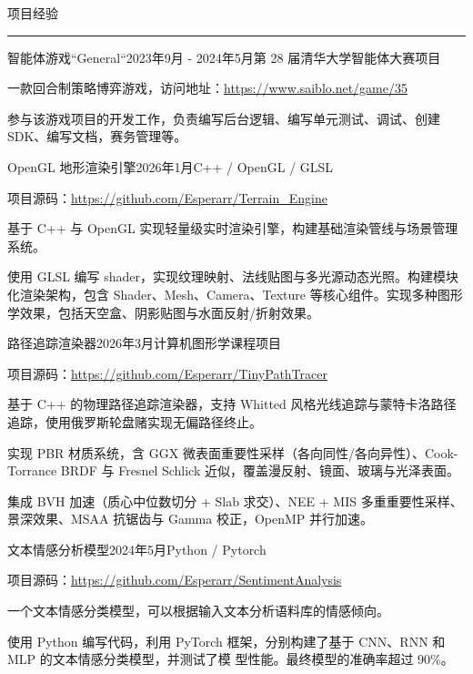 \documentclass{resume} %
\renewenvironment{rSection}[1]{
\sectionskip
\textcolor{TsinghuaPurple}{\MakeUppercase{#1}}
\sectionlineskip
\hrule
\begin{list}{}{
\setlength{\leftmargin}{0em}
}
\item[]
}{
\end{list}
}
\begin{document}
\begin{rSection}{项目经验}

\begin{rSubsection}{智能体游戏``General``}{2023年9月 - 2024年5月}{第 28 届清华大学智能体大赛项目}{}
\item 一款回合制策略博弈游戏，访问地址：\url{https://www.saiblo.net/game/35}
\item 参与该游戏项目的开发工作，负责编写后台逻辑、编写单元测试、调试、创建 SDK、编写文档，赛务管理等。
\end{rSubsection}  

\begin{rSubsection}{OpenGL 地形渲染引擎}{2026年1月}{C++ / OpenGL / GLSL}{}
\item 项目源码：\url{https://github.com/Esperarr/Terrain_Engine}
\item 基于 C++ 与 OpenGL 实现轻量级实时渲染引擎，构建基础渲染管线与场景管理系统。
\item 使用 GLSL 编写 shader，实现纹理映射、法线贴图与多光源动态光照。构建模块化渲染架构，包含 Shader、Mesh、Camera、Texture 等核心组件。实现多种图形学效果，包括天空盒、阴影贴图与水面反射/折射效果。
\end{rSubsection}

\begin{rSubsection}{路径追踪渲染器}{2026年3月}{计算机图形学课程项目}{}
\item 项目源码：\url{https://github.com/Esperarr/TinyPathTracer}
\item 基于 C++ 的物理路径追踪渲染器，支持 Whitted 风格光线追踪与蒙特卡洛路径追踪，使用俄罗斯轮盘赌实现无偏路径终止。
\item 实现 PBR 材质系统，含 GGX 微表面重要性采样（各向同性/各向异性）、Cook-Torrance BRDF 与 Fresnel Schlick 近似，覆盖漫反射、镜面、玻璃与光泽表面。
\item 集成 BVH 加速（质心中位数切分 + Slab 求交）、NEE + MIS 多重重要性采样、景深效果、MSAA 抗锯齿与 Gamma 校正，OpenMP 并行加速。
\end{rSubsection}

\begin{rSubsection}{文本情感分析模型}{2024年5月}{Python / Pytorch }{} 
\item 项目源码：\url{https://github.com/Esperarr/SentimentAnalysis}
\item 一个文本情感分类模型，可以根据输入文本分析语料库的情感倾向。
\item 使用 Python 编写代码，利用 PyTorch 框架，分别构建了基于 CNN、RNN 和 MLP 的文本情感分类模型，并测试了模
型性能。最终模型的准确率超过 90\%。
\end{rSubsection}


\end{rSection}
\end{document}

